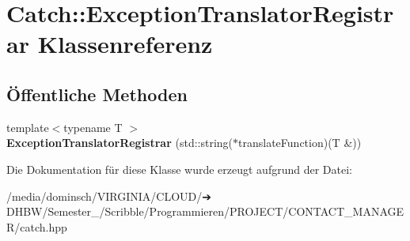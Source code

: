 \hypertarget{classCatch_1_1ExceptionTranslatorRegistrar}{}\section{Catch\+:\+:Exception\+Translator\+Registrar Klassenreferenz}
\label{classCatch_1_1ExceptionTranslatorRegistrar}
\subsection*{Öffentliche Methoden}
\begin{DoxyCompactItemize}
\item 
\mbox{\label{classCatch_1_1ExceptionTranslatorRegistrar_aa73229de911f26b1df6c6c87c4d9e04e}} 
{\footnotesize template$<$typename T $>$ }\\{\bfseries Exception\+Translator\+Registrar} (std\+::string($\ast$translate\+Function)(T \&))
\end{DoxyCompactItemize}


Die Dokumentation für diese Klasse wurde erzeugt aufgrund der Datei\+:\begin{DoxyCompactItemize}
\item 
/media/dominsch/\+V\+I\+R\+G\+I\+N\+I\+A/\+C\+L\+O\+U\+D/➔ D\+H\+B\+W/\+Semester\+\_/\+Scribble/\+Programmieren/\+P\+R\+O\+J\+E\+C\+T/\+C\+O\+N\+T\+A\+C\+T\+\_\+\+M\+A\+N\+A\+G\+E\+R/catch.\+hpp\end{DoxyCompactItemize}
